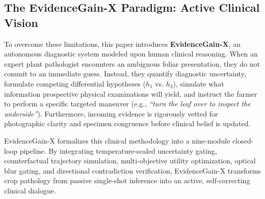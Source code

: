 \documentclass[conference]{IEEEtran}
\begin{document}
\subsection{The EvidenceGain-X Paradigm: Active Clinical Vision}
To overcome these limitations, this paper introduces \textbf{EvidenceGain-X}, an autonomous diagnostic system modeled upon human clinical reasoning. When an expert plant pathologist encounters an ambiguous foliar presentation, they do not commit to an immediate guess. Instead, they quantify diagnostic uncertainty, formulate competing differential hypotheses ($h_1$ vs. $h_2$), simulate what information prospective physical examinations will yield, and instruct the farmer to perform a specific targeted maneuver (e.g., \textit{``turn the leaf over to inspect the underside''}). Furthermore, incoming evidence is rigorously vetted for photographic clarity and specimen congruence before clinical belief is updated.

EvidenceGain-X formalizes this clinical methodology into a nine-module closed-loop pipeline. By integrating temperature-scaled uncertainty gating, counterfactual trajectory simulation, multi-objective utility optimization, optical blur gating, and directional contradiction verification, EvidenceGain-X transforms crop pathology from passive single-shot inference into an active, self-correcting clinical dialogue.
\end{document}
